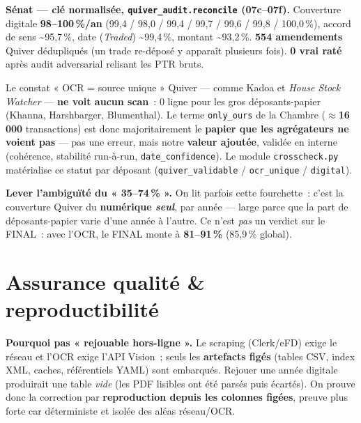\documentclass[11pt,a4paper]{article}
\newcommand{\co}[1]{\texttt{\small #1}}
\begin{document}
\textbf{Sénat — clé normalisée, \co{quiver_audit.reconcile} (07c--07f).} Couverture digitale
\textbf{98--100\,\%/an} (99,4 / 98,0 / 99,4 / 99,7 / 99,6 / 99,8 / 100,0\,\%), accord de sens
\textasciitilde 95,7\,\%, date (\emph{Traded}) \textasciitilde 99,4\,\%, montant \textasciitilde 93,2\,\%.
\textbf{554 amendements} Quiver dédupliqués (un trade re-déposé y apparaît plusieurs fois). \textbf{0
vrai raté} après audit adversarial relisant les PTR bruts.

\begin{keybox}{Le constat « OCR = source unique »}
Quiver — comme Kadoa et \emph{House Stock Watcher} — \textbf{ne voit aucun scan}~: 0 ligne pour les gros
déposants-papier (Khanna, Harshbarger, Blumenthal). Le terme \co{only_ours} de la Chambre
(\textbf{$\approx$16\,000} transactions) est donc majoritairement le \textbf{papier que les agrégateurs
ne voient pas} — pas une erreur, mais notre \textbf{valeur ajoutée}, validée en interne (cohérence,
stabilité run-à-run, \co{date_confidence}). Le module \co{crosscheck.py} matérialise ce statut par
déposant (\co{quiver_validable} / \co{ocr_unique} / \co{digital}).
\end{keybox}

\textbf{Lever l'ambiguïté du « 35--74\,\% ».} On lit parfois cette fourchette~: c'est la couverture
Quiver du \textbf{numérique \emph{seul}}, par année — large parce que la part de déposants-papier varie
d'une année à l'autre. Ce n'est \emph{pas} un verdict sur le FINAL~: avec l'OCR, le FINAL monte à
\textbf{81--91\,\%} (85,9\,\% global).

\section{Assurance qualité \& reproductibilité}
\label{sec:repro}

\textbf{Pourquoi pas « rejouable hors-ligne ».} Le scraping (Clerk/eFD) exige le réseau et l'OCR exige
l'API Vision~; seuls les \textbf{artefacts figés} (tables CSV, index XML, caches, référentiels YAML)
sont embarqués. Rejouer une année digitale produirait une table \emph{vide} (les PDF lisibles ont été
parsés puis écartés). On prouve donc la correction par \textbf{reproduction depuis les colonnes figées},
preuve plus forte car déterministe et isolée des aléas réseau/OCR.
\end{document}
